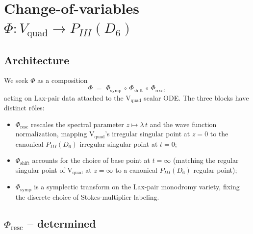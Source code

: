 %

\section*{Change-of-variables $\Phi: V_\mathrm{quad} \to P_{III}(D_6)$}
\label{sec:phi}

\subsection*{Architecture}

We seek $\Phi$ as a composition
\[
  \Phi \;=\; \Phi_\mathrm{symp} \,\circ\, \Phi_\mathrm{shift}
            \,\circ\, \Phi_\mathrm{resc},
\]
acting on Lax-pair data attached to the V$_\mathrm{quad}$
scalar ODE. The three blocks have distinct r\^oles:

\begin{itemize}
  \item $\Phi_\mathrm{resc}$ rescales the spectral parameter
        $z \mapsto \lambda\,t$ and the wave function
        normalization, mapping V$_\mathrm{quad}$'s irregular
        singular point at $z=0$ to the canonical $P_{III}(D_6)$
        irregular singular point at $t=0$;
  \item $\Phi_\mathrm{shift}$ accounts for the choice of base
        point at $t=\infty$ (matching the regular singular
        point of V$_\mathrm{quad}$ at $z=\infty$ to a
        canonical $P_{III}(D_6)$ regular point);
  \item $\Phi_\mathrm{symp}$ is a symplectic transform on the
        Lax-pair monodromy variety, fixing the discrete
        choice of Stokes-multiplier labeling.
\end{itemize}

\subsection*{$\Phi_\mathrm{resc}$ -- determined}

